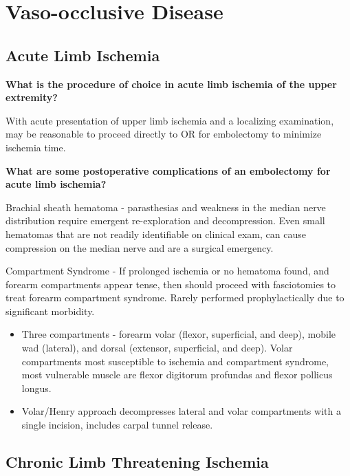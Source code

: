 \documentclass[
]{book}
\begin{document}
\hypertarget{vaso-occlusive-disease}{%
\section{Vaso-occlusive Disease}\label{vaso-occlusive-disease}}

\hypertarget{acute-limb-ischemia}{%
\subsection{Acute Limb Ischemia}\label{acute-limb-ischemia}}

\textbf{What is the procedure of choice in acute limb ischemia of the upper
extremity?}

With acute presentation of upper limb ischemia and a localizing
examination, may be reasonable to proceed directly to OR for embolectomy
to minimize ischemia time.\citep{wahlberg2006, henke2009}

\textbf{What are some postoperative complications of an embolectomy for acute
limb ischemia?}

Brachial sheath hematoma - parasthesias and weakness in the median nerve
distribution require emergent re-exploration and decompression. Even
small hematomas that are not readily identifiable on clinical exam, can
cause compression on the median nerve and are a surgical
emergency.\citep{tran2011}

Compartment Syndrome - If prolonged ischemia or no hematoma found, and
forearm compartments appear tense, then should proceed with fasciotomies
to treat forearm compartment syndrome. Rarely performed prophylactically
due to significant morbidity.\citep{gelberman1981, kistler2018, leversedge2011}

\begin{itemize}
\item
  Three compartments - forearm volar (flexor, superficial, and deep),
  mobile wad (lateral), and dorsal (extensor, superficial, and deep).
  Volar compartments most susceptible to ischemia and compartment
  syndrome, most vulnerable muscle are flexor digitorum profundas and
  flexor pollicus longus.\citep{ronel2004}
\item
  Volar/Henry approach decompresses lateral and volar compartments
  with a single incision, includes carpal tunnel release.
\end{itemize}

\hypertarget{chronic-limb-threatening-ischemia}{%
\subsection{Chronic Limb Threatening Ischemia}\label{chronic-limb-threatening-ischemia}}
\end{document}
